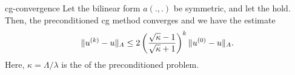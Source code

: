 \begin{Theorem}{cg-convergence}
  Let the bilinear form $a(.,.)$ be symmetric, and let the
   hold. Then,
  the preconditioned cg method converges and we have the estimate
  \begin{gather}
    \label{eq:cg:1}
    \lVert u^{(k)} - u\rVert_A \le 2
    \left(\frac{\sqrt\kappa-1}{\sqrt\kappa+1}\right)^k \lVert u^{(0)} - u\rVert_A.
  \end{gather}
  Here, $\kappa = \Lambda/\lambda$ is the  of the preconditioned problem.
\end{Theorem}

